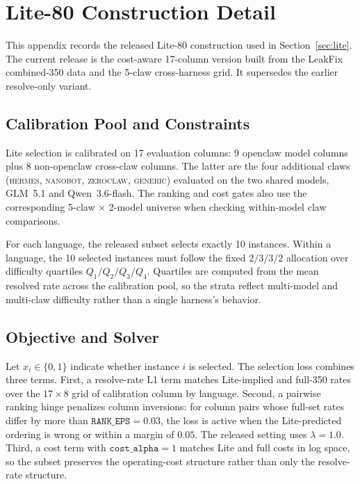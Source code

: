\section{Lite-80 Construction Detail}\label{appendix:lite}

This appendix records the released Lite-80 construction used in
Section~\ref{sec:lite}.  The current release is the cost-aware
17-column version built from the LeakFix combined-350 data and the
5-claw cross-harness grid.  It supersedes the earlier resolve-only
variant.

\subsection{Calibration Pool and Constraints}

Lite selection is calibrated on 17 evaluation columns: 9 openclaw model
columns plus 8 non-openclaw cross-claw columns.  The latter are the four
additional claws (\textsc{hermes}, \textsc{nanobot}, \textsc{zeroclaw},
\textsc{generic}) evaluated on the two shared models, GLM~5.1 and
Qwen~3.6-flash.  The ranking and cost gates also use the corresponding
5-claw $\times$ 2-model universe when checking within-model claw
comparisons.

For each language, the released subset selects exactly 10 instances.
Within a language, the 10 selected instances must follow the fixed
$2/3/3/2$ allocation over difficulty quartiles $Q_1/Q_2/Q_3/Q_4$.
Quartiles are computed from the mean resolved rate across the
calibration pool, so the strata reflect multi-model and multi-claw
difficulty rather than a single harness's behavior.

\subsection{Objective and Solver}

Let $x_i\in\{0,1\}$ indicate whether instance $i$ is selected.  The
selection loss combines three terms.  First, a resolve-rate L1 term
matches Lite-implied and full-350 rates over the $17\times 8$ grid of
calibration column by language.  Second, a pairwise ranking hinge
penalizes column inversions: for column pairs whose full-set rates
differ by more than $\texttt{RANK\_EPS}=0.03$, the loss is active when
the Lite-predicted ordering is wrong or within a margin of $0.05$.
The released setting uses $\lambda=1.0$.  Third, a cost term with
$\texttt{cost\_alpha}=1$ matches Lite and full costs in log space, so
the subset preserves the operating-cost structure rather than only the
resolve-rate structure.

